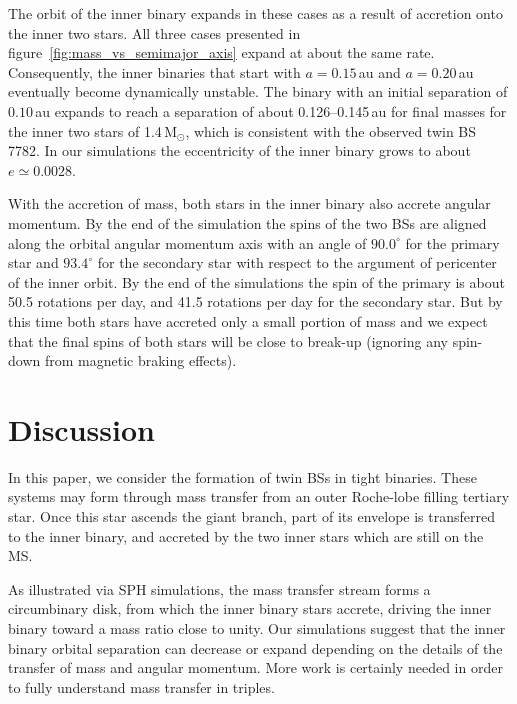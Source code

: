 \documentclass{aastex62}
\newcommand{\MSun}{\mbox{M$_\odot$}}
\begin{document}
The orbit of the inner binary expands in these cases as a result of
accretion onto the inner two stars. All three cases
presented in figure~\ref{fig:mass_vs_semimajor_axis} expand at about
the same rate. Consequently, the inner binaries that start with $a =
0.15$\,au and $a=0.20$\,au eventually become dynamically unstable.
The binary with an initial separation of $0.10$\,au expands to reach a
separation of about 0.126--0.145\,au for final masses for the inner two stars
of 1.4\,\MSun, which is consistent with the observed twin BS 7782. In our simulations the eccentricity of the inner
binary grows to about $e \simeq 0.0028$.

With the accretion of mass, both stars in the inner binary also
accrete angular momentum.  By the end of the simulation the spins of
the two BSs are aligned along the orbital angular momentum
axis with an angle of $90.0^\circ$ for the primary star and
$93.4^\circ$ for the secondary star with respect to the argument of
pericenter of the inner orbit.  By the end of the simulations the spin
of the primary is about 50.5 rotations per day, and 41.5 rotations per
day for the secondary star. But by this time both stars have accreted
only a small portion of mass and we expect that the final spins of
both stars will be close to break-up (ignoring any spin-down from
magnetic braking effects).

\section{Discussion} \label{sect:discussion}

In this paper, we consider the formation of twin BSs in tight binaries.
These systems may form through mass transfer from an outer Roche-lobe
filling tertiary star. Once this star ascends the giant branch, part
of its envelope is transferred to the inner binary, and accreted by
the two inner stars which are still on the MS.

As illustrated via SPH simulations, the mass transfer stream forms a
circumbinary disk, from which the inner binary stars accrete, driving
the inner binary toward a mass ratio close to unity.  Our simulations
suggest that the inner binary orbital separation can decrease or
expand depending on the details of the transfer of mass and angular
momentum.  More work is certainly needed in order to fully understand 
mass transfer in triples.
\end{document}
